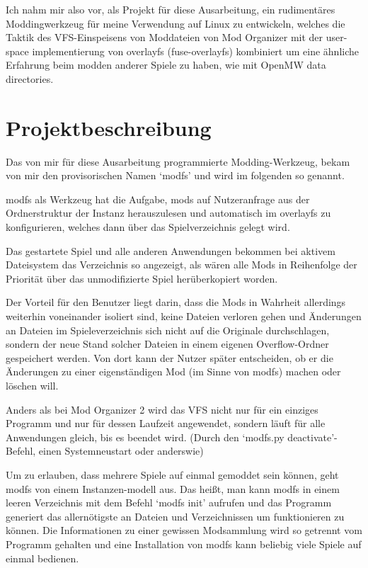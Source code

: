 \documentclass[a4paper,numbers=withenddot,11pt]{scrartcl}
\begin{document}
Ich nahm mir also vor, als Projekt für diese Ausarbeitung, ein rudimentäres
Moddingwerkzeug für meine Verwendung auf Linux zu entwickeln, welches
die Taktik des VFS-Einspeisens von Moddateien von Mod Organizer
mit der user-space implementierung von overlayfs (fuse-overlayfs)
kombiniert um eine ähnliche Erfahrung beim modden anderer Spiele zu haben,
wie mit OpenMW data directories.

\section{Projektbeschreibung}

Das von mir für diese Ausarbeitung programmierte Modding-Werkzeug,
bekam von mir den provisorischen Namen `modfs' und wird im folgenden so genannt.

modfs als Werkzeug hat die Aufgabe, mods auf Nutzeranfrage aus der
Ordnerstruktur der Instanz herauszulesen und automatisch im overlayfs zu
konfigurieren, welches dann über das Spielverzeichnis gelegt wird.

Das gestartete Spiel und alle anderen Anwendungen bekommen bei aktivem
Dateisystem das Verzeichnis so angezeigt, als wären alle Mods in Reihenfolge
der Priorität über das unmodifizierte Spiel herüberkopiert worden.

Der Vorteil für den Benutzer liegt darin, dass die Mods in Wahrheit
allerdings weiterhin voneinander isoliert sind, keine Dateien verloren gehen
und Änderungen an Dateien im Spieleverzeichnis sich nicht auf die Originale durchschlagen,
sondern der neue Stand solcher Dateien in einem eigenen Overflow-Ordner
gespeichert werden.
Von dort kann der Nutzer später entscheiden, ob er die Änderungen zu einer
eigenständigen Mod (im Sinne von modfs) machen oder löschen will.

Anders als bei Mod Organizer 2 wird das VFS nicht nur für ein einziges
Programm und nur für dessen Laufzeit angewendet, sondern läuft für alle
Anwendungen gleich, bis es beendet wird.
(Durch den `modfs.py deactivate'-Befehl, einen Systemneustart oder anderswie)

Um zu erlauben, dass mehrere Spiele auf einmal gemoddet sein können,
geht modfs von einem Instanzen-modell aus.
Das heißt, man kann modfs in einem leeren Verzeichnis mit dem Befehl
`modfs init' aufrufen und das Programm generiert das allernötigste an
Dateien und Verzeichnissen um funktionieren zu können.
Die Informationen zu einer gewissen Modsammlung wird so getrennt vom
Programm gehalten und eine Installation von modfs kann beliebig viele
Spiele auf einmal bedienen.
\end{document}
